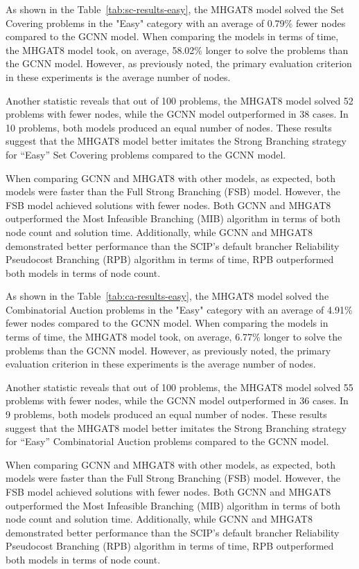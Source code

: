 As shown in the Table~\ref{tab:sc-results-easy}, the MHGAT8 model solved the Set Covering problems in the "Easy" category with an average of 0.79\% fewer nodes compared to the GCNN model.
When comparing the models in terms of time, the MHGAT8 model took, on average, 58.02\% longer to solve the problems than the GCNN model.
However, as previously noted, the primary evaluation criterion in these experiments is the average number of nodes.


Another statistic reveals that out of 100 problems, the MHGAT8 model solved 52 problems with fewer nodes, while the GCNN model outperformed in 38 cases.
In 10 problems, both models produced an equal number of nodes.
These results suggest that the MHGAT8 model better imitates the Strong Branching strategy for “Easy” Set Covering problems compared to the GCNN model.


When comparing GCNN and MHGAT8 with other models, as expected, both models were faster than the Full Strong Branching (FSB) model.
However, the FSB model achieved solutions with fewer nodes.
Both GCNN and MHGAT8 outperformed the Most Infeasible Branching (MIB) algorithm in terms of both node count and solution time.
Additionally, while GCNN and MHGAT8 demonstrated better performance than the SCIP’s default brancher Reliability Pseudocost Branching (RPB) algorithm in terms of time, RPB outperformed both models in terms of node count.



As shown in the Table~\ref{tab:ca-results-easy}, the MHGAT8 model solved the Combinatorial Auction problems in the "Easy" category with an average of 4.91\% fewer nodes compared to the GCNN model.
When comparing the models in terms of time, the MHGAT8 model took, on average, 6.77\% longer to solve the problems than the GCNN model.
However, as previously noted, the primary evaluation criterion in these experiments is the average number of nodes.


Another statistic reveals that out of 100 problems, the MHGAT8 model solved 55 problems with fewer nodes, while the GCNN model outperformed in 36 cases.
In 9 problems, both models produced an equal number of nodes.
These results suggest that the MHGAT8 model better imitates the Strong Branching strategy for “Easy” Combinatorial Auction problems compared to the GCNN model.


When comparing GCNN and MHGAT8 with other models, as expected, both models were faster than the Full Strong Branching (FSB) model.
However, the FSB model achieved solutions with fewer nodes.
Both GCNN and MHGAT8 outperformed the Most Infeasible Branching (MIB) algorithm in terms of both node count and solution time.
Additionally, while GCNN and MHGAT8 demonstrated better performance than the SCIP’s default brancher Reliability Pseudocost Branching (RPB) algorithm in terms of time, RPB outperformed both models in terms of node count.

